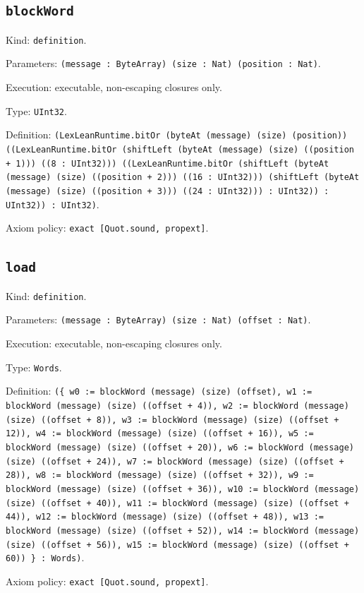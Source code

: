 \documentclass[11pt]{article}
\begin{document}
\subsection*{\texttt{blockWord}}
\noindent Kind: \texttt{definition}.\par
\noindent Parameters: \texttt{(message : ByteArray) (size : Nat) (position : Nat)}.\par
\noindent Execution: executable, non-escaping closures only.\par
\noindent Type: \texttt{UInt32}.\par
\noindent Definition: \texttt{(LexLeanRuntime.bitOr (byteAt (message) (size) (position)) ((LexLeanRuntime.bitOr (shiftLeft (byteAt (message) (size) ((position + 1))) ((8 : UInt32))) ((LexLeanRuntime.bitOr (shiftLeft (byteAt (message) (size) ((position + 2))) ((16 : UInt32))) (shiftLeft (byteAt (message) (size) ((position + 3))) ((24 : UInt32))) : UInt32)) : UInt32)) : UInt32)}.\par
\noindent Axiom policy: \texttt{exact [Quot.sound, propext]}.\par
\subsection*{\texttt{load}}
\noindent Kind: \texttt{definition}.\par
\noindent Parameters: \texttt{(message : ByteArray) (size : Nat) (offset : Nat)}.\par
\noindent Execution: executable, non-escaping closures only.\par
\noindent Type: \texttt{Words}.\par
\noindent Definition: \texttt{(\{ w0 := blockWord (message) (size) (offset), w1 := blockWord (message) (size) ((offset + 4)), w2 := blockWord (message) (size) ((offset + 8)), w3 := blockWord (message) (size) ((offset + 12)), w4 := blockWord (message) (size) ((offset + 16)), w5 := blockWord (message) (size) ((offset + 20)), w6 := blockWord (message) (size) ((offset + 24)), w7 := blockWord (message) (size) ((offset + 28)), w8 := blockWord (message) (size) ((offset + 32)), w9 := blockWord (message) (size) ((offset + 36)), w10 := blockWord (message) (size) ((offset + 40)), w11 := blockWord (message) (size) ((offset + 44)), w12 := blockWord (message) (size) ((offset + 48)), w13 := blockWord (message) (size) ((offset + 52)), w14 := blockWord (message) (size) ((offset + 56)), w15 := blockWord (message) (size) ((offset + 60)) \} : Words)}.\par
\noindent Axiom policy: \texttt{exact [Quot.sound, propext]}.\par
\end{document}
